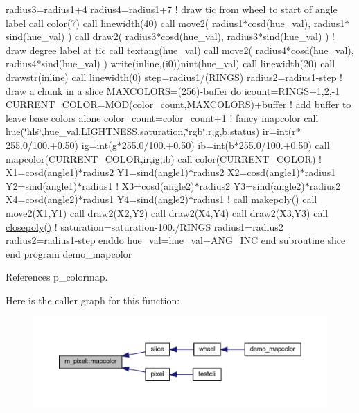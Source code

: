 radius3=radius1+4 radius4=radius1+7 ! draw tic from wheel to start of angle label call color(7) call linewidth(40) call move2( radius1$\ast$cosd(hue\+\_\+val), radius1$\ast$sind(hue\+\_\+val) ) call draw2( radius3$\ast$cosd(hue\+\_\+val), radius3$\ast$sind(hue\+\_\+val) ) ! draw degree label at tic call textang(hue\+\_\+val) call move2( radius4$\ast$cosd(hue\+\_\+val), radius4$\ast$sind(hue\+\_\+val) ) write(inline,\textquotesingle{}(i0)\textquotesingle{})nint(hue\+\_\+val) call linewidth(20) call drawstr(inline) call linewidth(0) step=radius1/(R\+I\+N\+GS) radius2=radius1-\/step ! draw a chunk in a slice M\+A\+X\+C\+O\+L\+O\+RS=(256)-\/buffer do icount=R\+I\+N\+G\+S+1,2,-\/1 C\+U\+R\+R\+E\+N\+T\+\_\+\+C\+O\+L\+OR=M\+O\+D(color\+\_\+count,\+M\+A\+X\+C\+O\+L\+O\+R\+S)+buffer ! add buffer to leave base colors alone color\+\_\+count=color\+\_\+count+1 ! fancy mapcolor call hue(\char`\"{}hls\char`\"{},hue\+\_\+val,L\+I\+G\+H\+T\+N\+E\+SS,saturation,\char`\"{}rgb\char`\"{},r,g,b,status) ir=int(r$\ast$255.0/100.+0.50) ig=int(g$\ast$255.0/100.+0.50) ib=int(b$\ast$255.0/100.+0.50) call mapcolor(\+C\+U\+R\+R\+E\+N\+T\+\_\+\+C\+O\+L\+O\+R,ir,ig,ib) call color(\+C\+U\+R\+R\+E\+N\+T\+\_\+\+C\+O\+L\+O\+R) ! X1=cosd(angle1)$\ast$radius2 Y1=sind(angle1)$\ast$radius2 X2=cosd(angle1)$\ast$radius1 Y2=sind(angle1)$\ast$radius1 ! X3=cosd(angle2)$\ast$radius2 Y3=sind(angle2)$\ast$radius2 X4=cosd(angle2)$\ast$radius1 Y4=sind(angle2)$\ast$radius1 ! call \hyperlink{namespacem__pixel_ab7128437f95b40004bf73fc6e3f597f8}{makepoly()} call move2(\+X1,\+Y1) call draw2(\+X2,\+Y2) call draw2(\+X4,\+Y4) call draw2(\+X3,\+Y3) call \hyperlink{namespacem__pixel_ab3dc83b63d2ab1bf3f63932abca4245d}{closepoly()} ! saturation=saturation-\/100./\+R\+I\+N\+GS radius1=radius2 radius2=radius1-\/step enddo hue\+\_\+val=hue\+\_\+val+\+A\+N\+G\+\_\+\+I\+NC end subroutine slice end program demo\+\_\+mapcolor 

References p\+\_\+colormap.

Here is the caller graph for this function\+:
\nopagebreak
\begin{figure}[H]
\begin{center}
\leavevmode
\includegraphics[width=350pt]{namespacem__pixel_a3422f51171f30979868a8075690da9f5_icgraph}
\end{center}
\end{figure}
\mbox{\label{namespacem__pixel_a84c841de62fc0addddeff305c4ede9d4}} 
